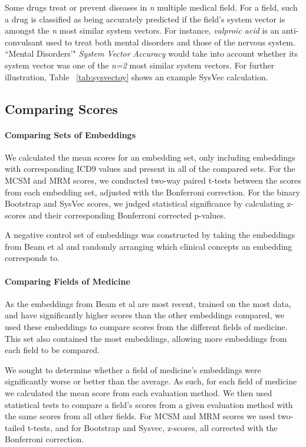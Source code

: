 \documentclass[11pt,a4paper]{article}
\begin{document}
Some drugs treat or prevent diseases in \emph{n} multiple medical field. For a field, such a drug is classified as being accurately predicted if the field's system vector is amongst the \emph{n} most similar system vectors. For instance, \emph{valproic acid} is an anti-convulsant used to treat both mental disorders and those of the nervous system. ``Mental Disorders'" \emph{System Vector Accuracy} would take into account whether its system vector was one of the \emph{n=2} most similar system vectors. For further illustration, Table ~\ref{tab:sysvectoy} shows an example SysVec calculation.



\subsection{Comparing Scores}

\paragraph{Comparing Sets of Embeddings}We calculated the mean scores for an embedding set, only including embeddings with corresponding ICD9 values and present in all of the compared sets. For the MCSM and MRM scores, we conducted two-way paired t-tests between the scores from each embedding set, adjusted with the Bonferroni correction. For the binary Bootstrap and SysVec scores, we judged statistical significance by calculating z-scores and their corresponding Bonferroni corrected p-values. 

A negative control set of embeddings was constructed by taking the embeddings from Beam et al  and randomly arranging which clinical concepts an embedding corresponds to. 

\paragraph{Comparing Fields of Medicine} As the embeddings from Beam et al  are most recent, trained on the most data, and have significantly higher scores than the other embeddings compared, we used these embeddings to compare scores from the different fields of medicine. This set also contained the most embeddings, allowing more embeddings from each field to be compared. 

We sought to determine whether a field of medicine's embeddings were significantly worse or better than the average. As such, for each field of medicine we calculated the mean score from each evaluation method. We then used statistical tests to compare a field's scores from a given evaluation method with the same scores from all other fields. For MCSM and MRM scores we used two-tailed t-tests, and for Bootstrap and Sysvec, z-scores, all corrected with the Bonferroni correction. 
\end{document}
